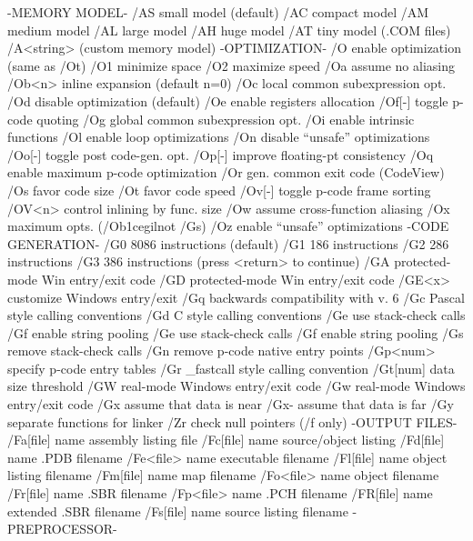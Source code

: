 {                            -MEMORY MODEL-
/AS small model (default)               /AC compact model
/AM medium model                        /AL large model
/AH huge model                          /AT tiny model (.COM files)
/A<string> (custom memory model)
                            -OPTIMIZATION-
/O enable optimization (same as /Ot)    /O1 minimize space
/O2 maximize speed                      /Oa assume no aliasing
/Ob<n> inline expansion (default n=0)   /Oc local common subexpression opt.
/Od disable optimization (default)      /Oe enable registers allocation
/Of[-] toggle p-code quoting            /Og global common subexpression opt.
/Oi enable intrinsic functions          /Ol enable loop optimizations
/On disable ``unsafe'' optimizations      /Oo[-] toggle post code-gen. opt.
/Op[-] improve floating-pt consistency  /Oq enable maximum p-code optimization
/Or gen. common exit code (CodeView)    /Os favor code size
/Ot favor code speed                    /Ov[-] toggle p-code frame sorting
/OV<n> control inlining by func. size   /Ow assume cross-function aliasing
/Ox maximum opts. (/Ob1cegilnot /Gs)    /Oz enable ``unsafe'' optimizations
                          -CODE GENERATION-
/G0 8086 instructions (default)         /G1  186 instructions
/G2  286 instructions                   /G3  386 instructions
  (press <return> to continue)
/GA protected-mode Win entry/exit code  /GD protected-mode Win entry/exit code
/GE<x> customize Windows entry/exit     /Gq backwards compatibility with v. 6
/Gc Pascal style calling conventions    /Gd C style calling conventions
/Ge use stack-check calls               /Gf enable string pooling
/Ge use stack-check calls               /Gf enable string pooling
/Gs remove stack-check calls            /Gn remove p-code native entry points
/Gp<num> specify p-code entry tables    /Gr _fastcall style calling convention
/Gt[num] data size threshold            /GW real-mode Windows entry/exit code
/Gw real-mode Windows entry/exit code   /Gx assume that data is near
/Gx- assume that data is far            /Gy separate functions for linker
/Zr check null pointers (/f only)
                            -OUTPUT FILES-
/Fa[file] name assembly listing file    /Fc[file] name source/object listing
/Fd[file] name .PDB filename            /Fe<file> name executable filename
/Fl[file] name object listing filename  /Fm[file] name map filename
/Fo<file> name object filename          /Fr[file] name .SBR filename
/Fp<file> name .PCH filename            /FR[file] name extended .SBR filename
/Fs[file] name source listing filename
                            -PREPROCESSOR-
}
